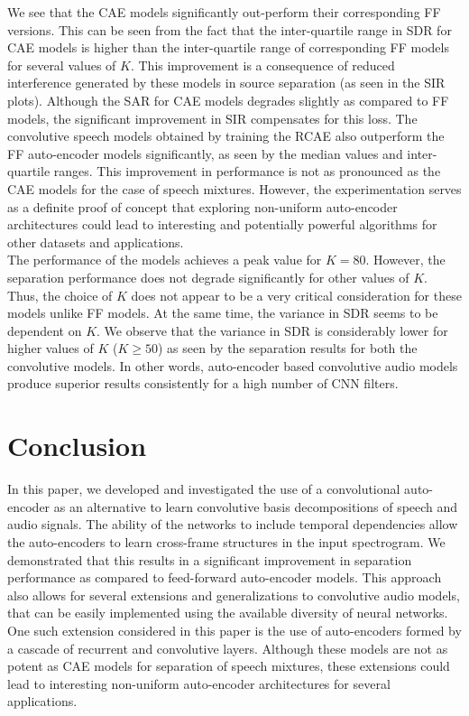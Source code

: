 \documentclass{article}
\begin{document}
We see that the CAE models significantly out-perform their corresponding FF versions. This can be seen from the fact that the inter-quartile range in SDR for CAE models is higher than the inter-quartile range of corresponding FF models for several values of $K$. This improvement is a consequence of reduced interference generated by these models in source separation (as seen in the SIR plots). Although the SAR for CAE models degrades slightly as compared to FF models, the significant improvement in SIR compensates for this loss. The convolutive speech models obtained by training the RCAE also outperform the FF auto-encoder models significantly, as seen by the median values and inter-quartile ranges. This improvement in performance is not as pronounced as the CAE models for the case of speech mixtures. However, the experimentation serves as a definite proof of concept that exploring non-uniform auto-encoder architectures could lead to interesting and potentially powerful algorithms for other datasets and applications. \\  

The performance of the models achieves a peak value for $K=80$. However, the separation performance does not degrade significantly for other values of $K$. Thus, the choice of $K$ does not appear to be a very critical consideration for these models unlike FF models. At the same time, the variance in SDR seems to be dependent on $K$. We observe that the variance in SDR is considerably lower for higher values of $K$ ($K\geq50$) as seen by the separation results for both the convolutive models. In other words, auto-encoder based convolutive audio models produce superior results consistently for a high number of CNN filters. \\

\section{Conclusion}
\label{sec:conclusion}
In this paper, we developed and investigated the use of a convolutional auto-encoder as an alternative to learn convolutive basis decompositions of speech and audio signals. The ability of the networks to include temporal dependencies allow the auto-encoders to learn cross-frame structures in the input spectrogram. We demonstrated that this results in a significant improvement in separation performance as compared to feed-forward auto-encoder models. This approach also allows for several extensions and generalizations to convolutive audio models, that can be easily implemented using the available diversity of neural networks. One such extension considered in this paper is the use of auto-encoders formed by a cascade of recurrent and convolutive layers. Although these models are not as potent as CAE models for separation of speech mixtures, these extensions could lead to interesting non-uniform auto-encoder architectures for several applications. \\
\end{document}
